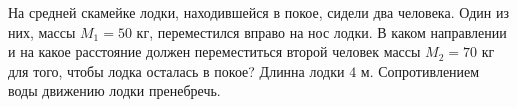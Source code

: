 На средней скамейке лодки, находившейся в покое, сидели два человека. Один из них, массы $M_1 = 50$ кг, переместился вправо на нос лодки. В каком направлении и на какое расстояние должен переместиться второй человек массы $M_2 = 70$ кг для того, чтобы лодка осталась в покое? Длинна лодки $4$ м. Сопротивлением воды движению лодки пренебречь.
